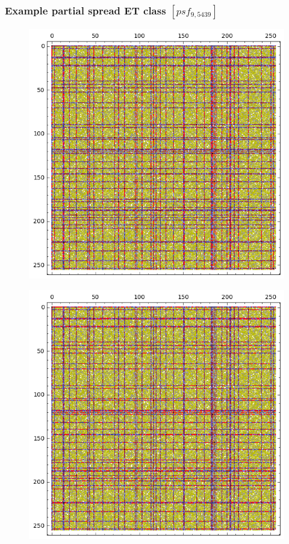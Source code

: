 \documentclass[pdf,sprung,slideColor,nocolorBG]{beamer}
\newenvironment{colortheme}[1]{
\def\ProvidesPackageRCS $##1${\relax}
\renewcommand{\ProcessOptions}{\relax}
\makeatletter

\makeatother
}{}
\begin{document}
\begin{colortheme}{jubata}
\begin{frame}
\frametitle{Example partial spread ET class $[psf_{9,5439}]$}
\begin{figure}
\centering
\begin{minipage}{.48\textwidth}
  \centering
  \includegraphics[width=.9\linewidth]{../matrix_plot/psf_9_5438_bent_cayley_graph_index_matrix.png}
  \label{fig:psf_9_5438_bent_cayley_graph_index_matrix}
\end{minipage}
\begin{minipage}{.48\textwidth}
  \centering
  \includegraphics[width=.9\linewidth]{../matrix_plot/psf_9_5438_dual_cayley_graph_index_matrix.png}

\end{minipage}
\end{figure}
\end{frame}
\end{colortheme}
\end{document}
